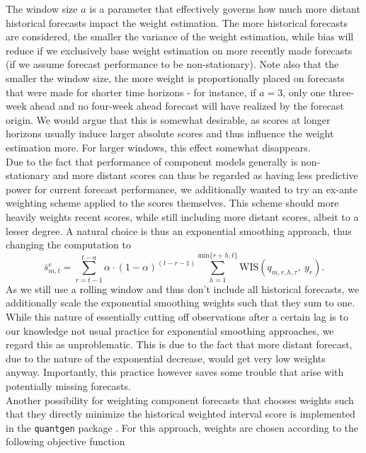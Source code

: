The window size $a$ is a parameter that effectively governs how much more distant historical forecasts impact the weight estimation. The more historical forecasts are considered, the smaller the variance of the weight estimation, while bias will reduce if we exclusively base weight estimation on more recently made forecasts (if we assume forecast performance to be non-stationary). Note also that the smaller the window size, the more weight is proportionally placed on forecasts that were made for shorter time horizons - for instance, if $a = 3$, only one three-week ahead and no four-week ahead forecast will have realized by the forecast origin. We would argue that this is somewhat desirable, as scores at longer horizons usually induce larger absolute scores and thus influence the weight estimation more. For larger windows, this effect somewhat disappears.\\
Due to the fact that performance of component models generally is non-stationary and more distant scores can thus be regarded as having less predictive power for current forecast performance, we additionally wanted to try an ex-ante weighting scheme applied to the scores themselves. This scheme should more heavily weights recent scores, while still including more distant scores, albeit to a lesser degree. A natural choice is thus an exponential smoothing approach, thus changing the computation to\\
\begin{equation}
\bar{s}_{m,t}^{e} = \sum_{r = t-1}^{t-a} \alpha \cdot (1-\alpha)^{(t-r-1)} \sum_{h = 1}^{\text{min}\{r+h, t\}} \text{WIS}(q_{m, r, h, \tau}, \ y_r).
\end{equation}
As we still use a rolling window and thus don't include all historical forecasts, we additionally scale the exponential smoothing weights such that they sum to one. While this nature of essentially cutting off observations after a certain lag is to our knowledge not usual practice for exponential smoothing approaches, we regard this as unproblematic. This is due to the fact that more distant forecast, due to the nature of the exponential decrease, would get very low weights anyway. Importantly, this practice however saves some trouble that arise with potentially missing forecasts. \\ 
Another possibility for weighting component forecasts that chooses weights such that they directly minimize the historical weighted interval score is implemented in the \texttt{quantgen} package \citep{tibshirani_quantgen_2020}. For this approach, weights are chosen according to the following objective function \\
